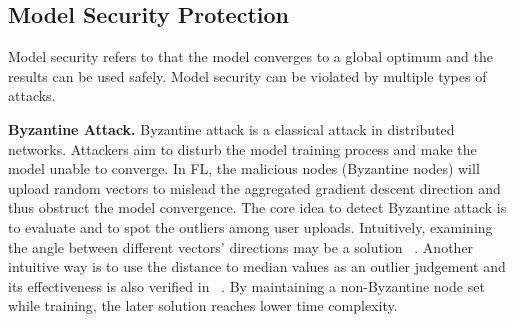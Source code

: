 \documentclass[11pt]{article}
\newcommand{\fakeparagraph}[1]{\vspace{1mm}\noindent\textbf{#1.}}
\begin{document}
\subsection{Model Security Protection}
Model security refers to that the model converges to a global optimum and the results can be used safely.
Model security can be violated by multiple types of attacks.

\fakeparagraph{Byzantine Attack} 
Byzantine attack is a classical attack in distributed networks. Attackers aim to disturb the model training process and make the model unable to converge.
In FL, the malicious nodes (Byzantine nodes) will upload random vectors to mislead the aggregated gradient descent direction and thus obstruct the model convergence. 
The core idea to detect Byzantine attack is to evaluate and to spot the outliers among user uploads. 
Intuitively, examining the angle between different vectors' directions may be a solution ~\cite{DBLP:conf/nips/BlanchardMGS17}.
Another intuitive way is to use the distance to median values as an outlier judgement and its effectiveness is also verified in ~\cite{DBLP:conf/nips/AlistarhA018}. 
By maintaining a non-Byzantine node set while training, the later solution reaches lower time complexity. 
\end{document}
